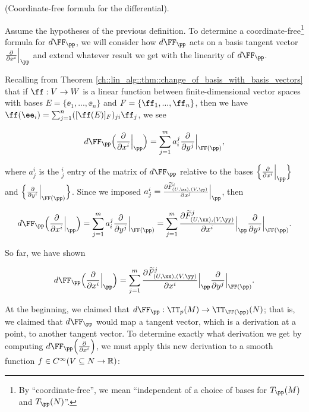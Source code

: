 \begin{deriv}
    (Coordinate-free formula for the differential).

    Assume the hypotheses of the previous definition. To determine a coordinate-free\footnote{By ``coordinate-free'', we mean ``independent of a choice of bases for $T_\pp(M)$ and $T_\pp(N)$''.} formula for $d\FF_\pp$, we will consider how $d\FF_\pp$ acts on a basis tangent vector $\frac{\pd}{\pd x^i}\Big|_\pp$ and extend whatever result we get with the linearity of $d\FF_\pp$. 
    
    Recalling from Theorem \ref{ch::lin_alg::thm::change_of_basis_with_basis_vectors} that if $\ff:V \rightarrow W$ is a linear function between finite-dimensional vector spaces with bases $E = \{\ee_1, ..., \ee_n\}$ and $F = \{\ff_1, ..., \ff_n\}$, then we have $\ff(\ee_i) = \sum_{j = 1}^n ([\ff(E)]_F)_{ji} \ff_j$, we see
    
    \begin{align*}
        d\FF_\pp \Big( \frac{\pd}{\pd x^i}\Big|_\pp \Big) 
        = 
        \sum_{j = 1}^m a^j_i \frac{\pd}{\pd y^j}\Big|_{\FF(\pp)},
    \end{align*}
    
    where $a^i_j$ is the $^i_j$ entry of the matrix of $d\FF_\pp$ relative to the bases $\Big\{ \frac{\pd}{\pd x^i} \Big|_\pp \Big\}$ and $\Big\{ \frac{\pd}{\pd y^i} \Big|_{\FF(\pp)} \Big\}$. Since we imposed $a^i_j = \frac{\pd \tF_{(U, \xx), (V, \yy)}^i}{\pd x^j}\Big|_\pp$, then
    
    \begin{align*}
       d\FF_\pp \Big( \frac{\pd}{\pd x^i}\Big|_\pp \Big) = 
       \sum_{j = 1}^m a^j_i \frac{\pd}{\pd y^j}\Big|_{\FF(\pp)} =
       \sum_{j = 1}^m \frac{\pd \tF_{(U, \xx), (V, \yy)}^j}{\pd x^i}\Big|_\pp \frac{\pd}{\pd y^j}\Big|_{\FF(\pp)}.
    \end{align*}
    
    So far, we have shown 
    
    \begin{align*}
        d\FF_\pp \Big( \frac{\pd}{\pd x^i}\Big|_\pp \Big) = \sum_{j = 1}^m \frac{\pd \tF_{(U, \xx), (V, \yy)}^j}{\pd x^i}\Big|_\pp \frac{\pd}{\pd y^j}\Big|_{\FF(\pp)}.
    \end{align*}
    
    At the beginning, we claimed that $d\FF_\pp:\TT_p(M) \rightarrow \TT_{\FF(\pp)}(N)$; that is, we claimed that $d\FF_\pp$ would map a tangent vector, which is a derivation at a point, to another tangent vector. To determine exactly what derivation we get by computing $d\FF_\pp \Big( \frac{\pd}{\pd x^i} \Big)$, we must apply this new derivation to a smooth function $f \in C^\infty(V \subseteq N \rightarrow \mathbb{R})$:
    

\end{deriv}

